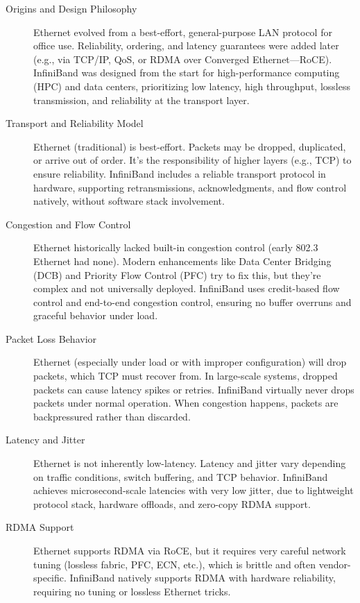 \begin{description}
\item  [Origins and Design Philosophy]
Ethernet evolved from a best-effort, general-purpose LAN protocol for office use. Reliability, ordering, and latency guarantees were added later (e.g., via TCP/IP, QoS, or RDMA over Converged Ethernet—RoCE).
InfiniBand was designed from the start for high-performance computing (HPC) and data centers, prioritizing low latency, high throughput, lossless transmission, and reliability at the transport layer.

\item [Transport and Reliability Model]
Ethernet (traditional) is best-effort. Packets may be dropped, duplicated, or arrive out of order. It's the responsibility of higher layers (e.g., TCP) to ensure reliability.
InfiniBand includes a reliable transport protocol in hardware, supporting retransmissions, acknowledgments, and flow control natively, without software stack involvement.

\item [Congestion and Flow Control]
Ethernet historically lacked built-in congestion control (early 802.3 Ethernet had none). Modern enhancements like Data Center Bridging (DCB) and Priority Flow Control (PFC) try to fix this, but they're complex and not universally deployed.
InfiniBand uses credit-based flow control and end-to-end congestion control, ensuring no buffer overruns and graceful behavior under load.

\item [Packet Loss Behavior]
Ethernet (especially under load or with improper configuration) will drop packets, which TCP must recover from. In large-scale systems, dropped packets can cause latency spikes or retries.
InfiniBand virtually never drops packets under normal operation. When congestion happens, packets are backpressured rather than discarded.

\item [Latency and Jitter]
Ethernet is not inherently low-latency. Latency and jitter vary depending on traffic conditions, switch buffering, and TCP behavior.
InfiniBand achieves microsecond-scale latencies with very low jitter, due to lightweight protocol stack, hardware offloads, and zero-copy RDMA support.

\item [RDMA Support]
Ethernet supports RDMA via RoCE, but it requires very careful network tuning (lossless fabric, PFC, ECN, etc.), which is brittle and often vendor-specific.
InfiniBand natively supports RDMA with hardware reliability, requiring no tuning or lossless Ethernet tricks.


\end{description}
